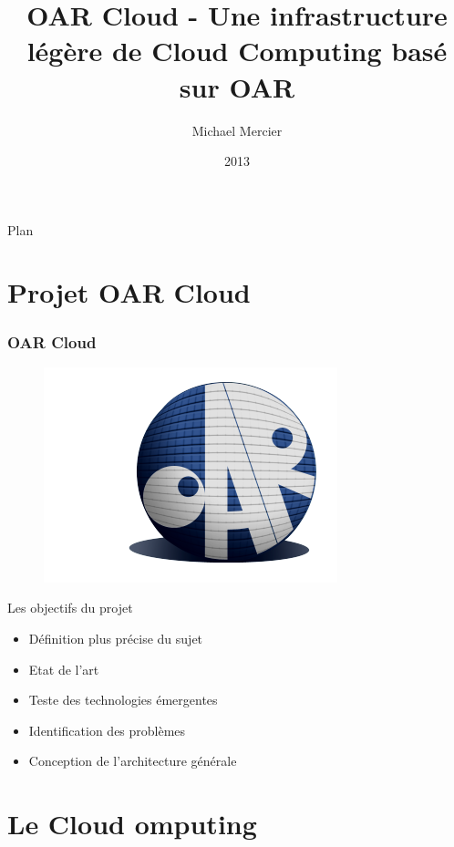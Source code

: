 \documentclass{beamer}
\title[OAR Cloud]{OAR Cloud - Une infrastructure légère de Cloud Computing basé sur OAR}
\institute{Polytech Grenoble, INRIA\\\scalebox{2}{\insertlogo}}
\author{Michael Mercier}
\date{2013}
\begin{document}
	\begin{frame}
		\titlepage
	\end{frame}
	
	
	\begin{frame} 
		\begin{center}{\Large Plan }\end{center}
		\tableofcontents[hidesubsections]
	\end{frame}
	
	
  \section{Projet OAR Cloud}
		\begin{frame}
			\frametitle{OAR Cloud}
			\begin{figure}
			  \includegraphics[scale=0.3]{img/logo_oar.png}
 			\end{figure}
			Les objectifs du projet
			\begin{itemize}
			  \item Définition plus précise du sujet
			  \item Etat de l'art
			  \item Teste des technologies émergentes
			  \item Identification des problèmes
			  \item Conception de l'architecture générale
			\end{itemize}			
		\end{frame}
			
			
			
	\section{Le Cloud omputing}
	
\end{document}
